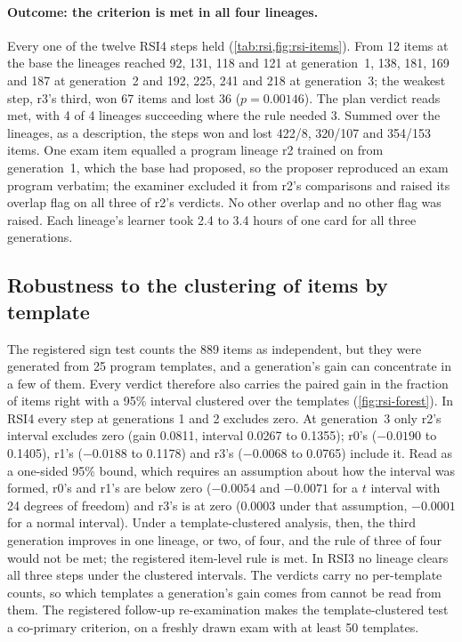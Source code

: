 \paragraph{Outcome: the criterion is met in all four lineages.} Every one of the twelve RSI4 steps
held (\cref{tab:rsi,fig:rsi-items}). From 12 items at the base the lineages reached 92,
131, 118 and 121 at generation~1, 138, 181, 169 and 187 at generation~2 and 192, 225, 241 and 218 at
generation~3; the weakest step, r3's third, won 67 items and lost 36 ($p=0.00146$). The plan
verdict reads met, with 4 of 4 lineages succeeding where the rule needed 3. Summed over the
lineages, as a description, the steps won and lost 422/8, 320/107 and 354/153 items. One exam
item equalled a program lineage r2 trained on from generation~1, which the base had proposed, so the
proposer reproduced an exam program verbatim; the examiner excluded it from r2's comparisons and raised
its overlap flag on all three of r2's verdicts. No other overlap and no other flag was
raised. Each lineage's learner took 2.4 to 3.4 hours of one card for all three
generations.

\subsection{Robustness to the clustering of items by template}\label{sec:rsi-robust}

The registered sign test counts the 889 items as independent, but they were generated from 25 program
templates, and a generation's gain can concentrate in a few of them. Every verdict therefore also
carries the paired gain in the fraction of items right with a 95\% interval clustered over the
templates (\cref{fig:rsi-forest}). In RSI4 every step at generations 1 and 2 excludes zero. At
generation~3 only r2's interval excludes zero (gain 0.0811, interval 0.0267 to 0.1355); r0's
($-0.0190$ to 0.1405), r1's ($-0.0188$ to 0.1178) and r3's ($-0.0068$ to 0.0765) include it. Read as a
one-sided 95\% bound, which requires an assumption about how the interval was formed, r0's and r1's
are below zero ($-0.0054$ and $-0.0071$ for a $t$ interval with 24 degrees of freedom) and r3's is at
zero (0.0003 under that assumption, $-0.0001$ for a normal interval). Under a template-clustered
analysis, then, the third generation improves in one lineage, or two, of four, and the rule of three
of four would not be met; the registered item-level rule is met. In RSI3 no lineage clears all three
steps under the clustered intervals. The verdicts carry no per-template counts, so which templates a
generation's gain comes from cannot be read from them. The registered follow-up re-examination makes the
template-clustered test a co-primary criterion, on a freshly drawn exam with at least 50
templates.

